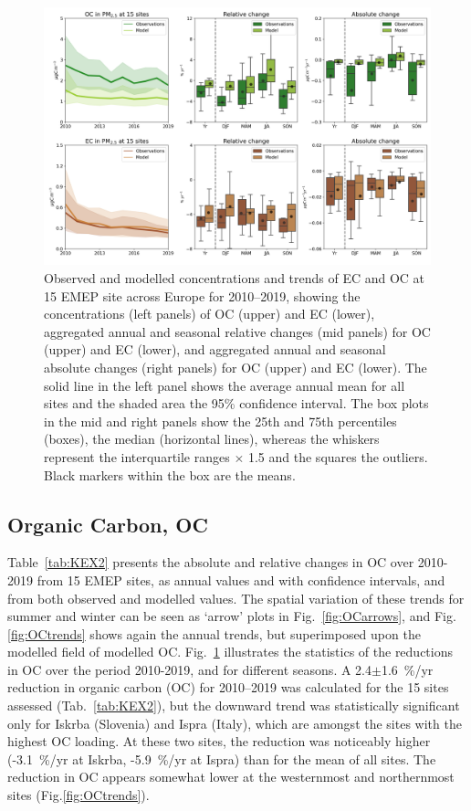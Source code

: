\begin{figure}[t]
\includegraphics[width=16cm]{FIGS_TRENDS/ECOC_trends.png}
\caption{Observed and modelled concentrations and trends of EC and OC at 15 EMEP
  site across Europe for 2010--2019, showing the concentrations
  (left panels) of OC (upper) and EC (lower), aggregated annual and
  seasonal relative changes (mid panels) for OC (upper) and EC (lower),
  and aggregated annual and seasonal absolute changes (right panels)
  for OC (upper) and EC (lower). The solid line in the left panel shows
  the average annual mean for all sites and the shaded area the 95\%
  confidence interval. The box plots in the mid and right panels show
  the 25th and 75th percentiles (boxes), the median (horizontal lines),
  whereas the whiskers represent the interquartile ranges $\times$
  1.5 and the squares the outliers. Black markers within the box are
  the means.\label{fig:KEX1}
}
\end{figure}







\subsection{Organic Carbon, OC}
\label{ss:trendsOC}
 
 Table~\ref{tab:KEX2} presents the absolute and relative changes in OC over 2010-2019 from 15 EMEP sites, as annual values and with confidence intervals, and from both observed and modelled values. The spatial variation of these trends for summer and winter can be seen as `arrow' plots in Fig.~\ref{fig:OCarrows}, and Fig.\ref{fig:OCtrends} shows again the annual trends, but superimposed upon the modelled field of modelled OC.
Fig.~\ref{fig:KEX1} illustrates the statistics of the reductions in OC  over the period 2010-2019, and for different seasons. 
A 2.4$\pm$1.6~\%/yr reduction
  in organic carbon (OC) for 2010--2019
was calculated for the 15 sites assessed (Tab.~\ref{tab:KEX2}), but the
downward trend was statistically significant only for Iskrba (Slovenia)
and Ispra (Italy), which are amongst the sites with the highest OC
loading. At these two sites, the reduction was noticeably higher 
(-3.1~\%/yr at Iskrba, -5.9~\%/yr at Ispra) than for the mean of all sites. The
reduction in OC appears somewhat lower at the westernmost and northernmost
sites (Fig.\ref{fig:OCtrends}). 


